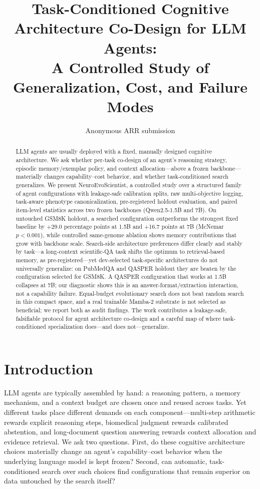 \documentclass[11pt]{article}
\title{Task-Conditioned Cognitive Architecture Co-Design for LLM Agents:\\
A Controlled Study of Generalization, Cost, and Failure Modes}
\author{Anonymous ARR submission}
\date{}
\begin{document}
\maketitle

\begin{abstract}
LLM agents are usually deployed with a fixed, manually designed cognitive
architecture. We ask whether per-task co-design of an agent's reasoning
strategy, episodic memory/exemplar policy, and context allocation---above a
frozen backbone---materially changes capability--cost behavior, and whether
task-conditioned search generalizes. We present NeuroEvoScientist, a
controlled study over a structured family of agent configurations with
leakage-safe calibration splits, raw multi-objective logging, task-aware
phenotype canonicalization, pre-registered holdout evaluation, and paired
item-level statistics across two frozen backbones (Qwen2.5-1.5B and 7B).
On untouched GSM8K holdout, a searched configuration outperforms the
strongest fixed baseline by +29.0 percentage points at 1.5B and +16.7
points at 7B (McNemar $p<0.001$), while controlled same-genome ablation
shows memory contributions that grow with backbone scale. Search-side
architecture preferences differ clearly and stably by task---a long-context
scientific-QA task shifts the optimum to retrieval-based memory, as
pre-registered---yet dev-selected task-specific architectures do not
universally generalize: on PubMedQA and QASPER holdout they are beaten by
the configuration selected for GSM8K. A QASPER configuration that works at
1.5B collapses at 7B; our diagnostic shows this is an
answer-format/extraction interaction, not a capability failure.
Equal-budget evolutionary search does not beat random search in this
compact space, and a real trainable Mamba-2 substrate is not selected as
beneficial; we report both as audit findings. The work contributes a
leakage-safe, falsifiable protocol for agent architecture co-design and a
careful map of where task-conditioned specialization does---and does
not---generalize.
\end{abstract}

\section{Introduction}

LLM agents are typically assembled by hand: a reasoning pattern, a memory
mechanism, and a context budget are chosen once and reused across tasks. Yet
different tasks place different demands on each component---multi-step
arithmetic rewards explicit reasoning steps, biomedical judgment rewards
calibrated abstention, and long-document question answering rewards context
allocation and evidence retrieval. We ask two questions. First, do these
cognitive architecture choices materially change an agent's capability--cost
behavior when the underlying language model is kept frozen? Second, can
automatic, task-conditioned search over such choices find configurations
that remain superior on data untouched by the search itself?
\end{document}
